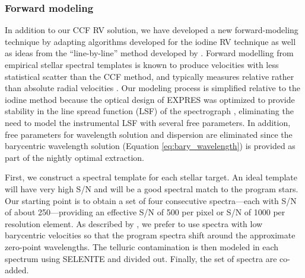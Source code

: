 \subsubsection{Forward modeling}\label{forward-modeling}

In addition to our CCF RV solution, we have developed a new forward-modeling technique by adapting algorithms developed for the iodine RV technique \citep{marcy_precision_1992, butler_attaining_1996} as well as ideas from the ``line-by-line'' method developed by \citet{dumusque_measuring_2018}. Forward modelling from empirical stellar spectral templates is known to produce velocities with less statistical scatter than the CCF method, and typically measures relative rather than absolute radial velocities \citep{anglada-escude_harps-terra_2012}. Our modeling process is simplified relative to the iodine method because the optical design of EXPRES was optimized to provide stability in the line spread function (LSF) of the spectrograph \citep{jurgenson_expres_2016, blackman_performance_2020}, eliminating the need to model the instrumental LSF with several free parameters. In addition, free parameters for wavelength solution and dispersion are eliminated since the barycentric wavelength solution (Equation \ref{eq:bary_wavelength}) is provided as part of the nightly optimal extraction.

First, we construct a spectral template for each stellar target. An ideal template will have very high S/N and will be a good spectral match to the program stars. Our starting point is to obtain a set of four consecutive spectra---each with S/N of about 250---providing an effective S/N of 500 per pixel or S/N of 1000 per resolution element. As described by \citet{dumusque_measuring_2018}, we prefer to use spectra with low barycentric velocities so that the program spectra shift around the approximate zero-point wavelengths. The telluric contamination is then modeled in each spectrum using SELENITE \citep{leet_toward_2019} and divided out. Finally, the set of spectra are co-added.

